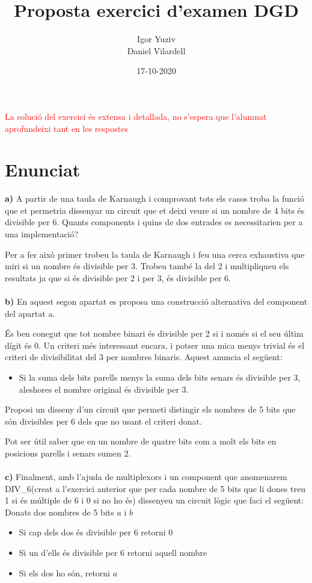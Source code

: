 \documentclass[12pt, a4papre]{article}
\author{Igor Yuziv\\
	Daniel Vilardell}
\title{Proposta exercici d'examen DGD}
\date{17-10-2020}
\begin{document}
	\maketitle
	\begin{center}
	\footnotesize{
		\textcolor{red}{La solució del exercici és extensa i detallada, no s'espera que l'alumnat aprofundeixi tant en les respostes}
		}
	\end{center}
	\newpage
	\section{Enunciat} 
	\textbf{a)} A partir de una taula de Karnaugh i comprovant tots els casos troba la funció que et permetria dissenyar un circuit que et deixi veure si un nombre de 4 bits és divisible per 6. Quants components i quins de dos entrades es necessitarien per a una implementació? 
	
	Per a fer això primer trobeu la taula de Karnaugh i feu una cerca exhaustiva que miri si un nombre és divisible per 3. Trobeu també la del 2 i multipliqueu els resultats ja que si és divisible per 2 i per 3, és divisible per 6.
	\\\\
	
	\textbf{b)} En aquest segon apartat es proposa una construcció alternativa del component del apartat a.
	
	És ben conegut que tot nombre binari és divisible per 2 si i només si el seu últim dígit és 0. Un criteri més interessant encara, i potser una mica menys trivial és el criteri de divisibilitat del 3 per nombres binaris. Aquest anuncia el següent:
	\begin{itemize}
	\item Si la suma dels bits parells menys la suma dels bits senars és divisible per 3, aleshores el nombre original és divisible per 3. 
	\end{itemize}
	
	Proposi un disseny d'un circuit que permeti distingir els nombres de 5 bits que són divisibles per 6 dels que no usant el criteri donat.
	
	Pot ser útil saber que en un nombre de quatre bits com a molt els bits en posicions parells i senars sumen 2.
	\\\\
	
	\textbf{c)} Finalment, amb l'ajuda de multiplexors i un component que anomenarem DIV\_6(creat a l'exercici anterior que per cada nombre de 5 bits que li dones treu 1 si és múltiple de 6 i 0 si no ho és) dissenyeu un circuit lògic que faci el següent: Donats dos nombres de 5 bits $a$ i $b$
	\begin{itemize}
	\item Si cap dels dos és divisible per 6 retorni 0
	\item Si un d'ells és divisible per 6 retorni aquell nombre
	\item Si els dos ho són, retorni $a$ 
	\end{itemize}
	
\end{document}
